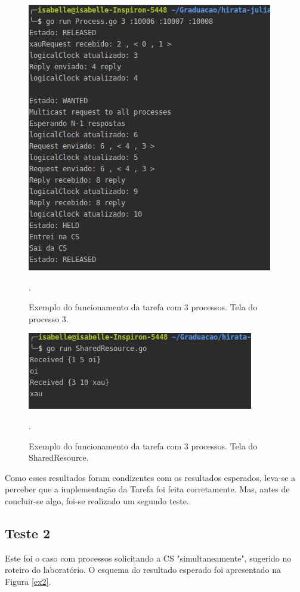 \documentclass[conference]{IEEEtran}
\begin{document}
\begin{figure}[H]
\centering
\centerline{\includegraphics[scale=0.5]{imagens/ex1-proc3.png}}
\caption{Exemplo do funcionamento da tarefa com 3 processos. Tela do processo 3.}.
\label{ex1-proc3}
\end{figure}

\begin{figure}[H]
\centering
\centerline{\includegraphics[scale=0.5]{imagens/ex1-shared.png}}
\caption{Exemplo do funcionamento da tarefa com 3 processos. Tela do SharedResource.}.
\label{ex1-shared}
\end{figure}

	Como esses resultados foram condizentes com os resultados esperados, leva-se a perceber que a implementação da Tarefa foi feita corretamente. Mas, antes de concluir-se algo, foi-se realizado um segundo teste.

\subsection{Teste 2}

	Este foi o caso com processos solicitando a CS "simultaneamente", sugerido no roteiro do laboratório. O esquema do resultado esperado foi apresentado na Figura \ref{ex2}.
	
\end{document}
